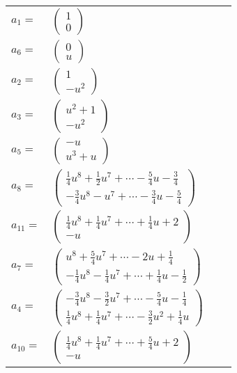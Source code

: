 \documentclass[1p]{elsarticle_modified}
\theoremstyle{definition}
\begin{document}
\begin{tabular}{m{7pt} m{180pt} m{7pt} m{180pt} }
\flushright $a_{1}=$&$\begin{pmatrix}1\\0\end{pmatrix}$ \\
\flushright $a_{6}=$&$\begin{pmatrix}0\\u\end{pmatrix}$ \\
\flushright $a_{2}=$&$\begin{pmatrix}1\\- u^2\end{pmatrix}$ \\
\flushright $a_{3}=$&$\begin{pmatrix}u^2+1\\- u^2\end{pmatrix}$ \\
\flushright $a_{5}=$&$\begin{pmatrix}- u\\u^3+u\end{pmatrix}$ \\
\flushright $a_{8}=$&$\begin{pmatrix}\frac{1}{4} u^8+\frac{1}{2} u^7+\cdots-\frac{5}{4} u-\frac{3}{4}\\-\frac{3}{4} u^8- u^7+\cdots-\frac{3}{4} u-\frac{5}{4}\end{pmatrix}$ \\
\flushright $a_{11}=$&$\begin{pmatrix}\frac{1}{4} u^8+\frac{1}{4} u^7+\cdots+\frac{1}{4} u+2\\- u\end{pmatrix}$ \\
\flushright $a_{7}=$&$\begin{pmatrix}u^8+\frac{5}{4} u^7+\cdots-2 u+\frac{1}{4}\\-\frac{1}{4} u^8-\frac{1}{4} u^7+\cdots+\frac{1}{4} u-\frac{1}{2}\end{pmatrix}$ \\
\flushright $a_{4}=$&$\begin{pmatrix}-\frac{3}{4} u^8-\frac{3}{2} u^7+\cdots-\frac{5}{4} u-\frac{1}{4}\\\frac{1}{4} u^8+\frac{1}{4} u^7+\cdots-\frac{3}{2} u^2+\frac{1}{4} u\end{pmatrix}$ \\
\flushright $a_{10}=$&$\begin{pmatrix}\frac{1}{4} u^8+\frac{1}{4} u^7+\cdots+\frac{5}{4} u+2\\- u\end{pmatrix}$ \\

\end{tabular}
\end{document}
